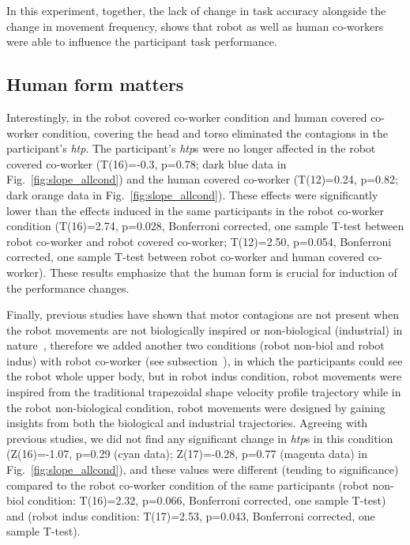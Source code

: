 In this experiment, together, the lack of change in task accuracy alongside the change in movement frequency, shows that robot as well as human co-workers were able to influence the participant task performance.


\subsection{Human form matters}

Interestingly, in the robot covered co-worker condition and human covered co-worker condition, covering the head and torso eliminated the contagions in the participant's \textit{htp}. The participant's {\it htp}s were no longer affected in the robot covered co-worker (T(16)=-0.3, p=0.78; dark blue data in Fig.~\ref{fig:slope_allcond}) and the human covered co-worker (T(12)=0.24, p=0.82; dark orange data in Fig.~\ref{fig:slope_allcond}). These effects were significantly lower than the effects induced in the same participants in the robot co-worker condition (T(16)=2.74, p=0.028, Bonferroni corrected, one sample T-test between robot co-worker and robot covered co-worker; T(12)=2.50, p=0.054, Bonferroni corrected, one sample T-test between robot co-worker and human covered co-worker). These results emphasize that the human form is crucial for induction of the performance changes.

Finally, previous studies have shown that motor contagions are not present when the robot movements are not biologically inspired or non-biological (industrial) in nature~\cite{Kilner:CurBio:2003,Bisio:PlosOne:2014}, therefore we added another two conditions (robot non-biol and robot indus) with robot co-worker (see subsection~), in which the participants could see the robot whole upper body, but in robot indus condition, robot movements were inspired from the traditional trapezoidal shape velocity profile trajectory while in the robot non-biological condition, robot movements were designed by gaining insights from both the biological and industrial trajectories. Agreeing with previous studies, we did not find any significant change in {\it htp}s in this condition (Z(16)=-1.07, p=0.29 (cyan data); Z(17)=-0.28, p=0.77 (magenta data) in Fig.~\ref{fig:slope_allcond}), and these values were different (tending to significance) compared to the robot co-worker condition of the same participants (robot non-biol condition: T(16)=2.32, p=0.066, Bonferroni corrected, one sample T-test) and (robot indus condition: T(17)=2.53, p=0.043, Bonferroni corrected, one sample T-test).


